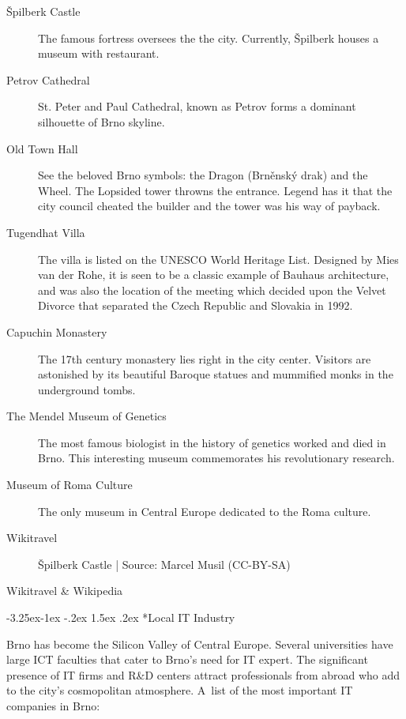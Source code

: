 \documentclass[10pt,a4paper]{article}
\makeatletter
\renewcommand\subsection{%
\@startsection{subsection}{2}{\z@}%
              {-3.25ex\@plus -1ex \@minus -.2ex}%
              {1.5ex \@plus .2ex}%
              {\color{kdelight}\sffamily\Large\bfseries}}
\makeatother
\begin{document}
\begin{description}
\item[\color{kdedarker} Špilberk Castle] The famous fortress oversees the the city. Currently, \mbox{Špilberk} houses a museum with restaurant.
\item[\color{kdedarker} Petrov Cathedral] St. Peter and Paul Cathedral, known as Petrov forms a dominant silhouette of Brno skyline.
\item[\color{kdedarker} Old Town Hall] See the beloved Brno symbols: the Dragon (Brněnský drak) and the Wheel. The Lopsided tower throwns the entrance. Legend has it that the city council cheated the builder and the tower was his way of payback.
\item[\color{kdedarker} Tugendhat Villa] The villa is listed on the UNESCO World Heritage List. Designed by Mies van der Rohe, it is seen to be a classic example of Bauhaus architecture, and was also the location of the meeting which decided upon the Velvet Divorce that separated the Czech Republic and Slovakia in 1992.
\item[\color{kdedarker} Capuchin Monastery] The 17th century monastery lies right in the city center. Visitors are astonished by its beautiful Baroque statues and mummified monks in the underground tombs.
\item[\color{kdedarker} The Mendel Museum of Genetics] The most famous biologist in the history of genetics worked and died in Brno. This interesting museum commemorates his revolutionary research.
\item[\color{kdedarker} Museum of Roma Culture] The only museum in Central Europe dedicated to the Roma culture.
\end{description}

\begin{flushright}Wikitravel\end{flushright}


\begin{figure}[ht]
\begin{center}
\footnotesize{Špilberk Castle | Source: Marcel Musil (CC-BY-SA)}
\end{center}
\end{figure}

\begin{flushright}Wikitravel \& Wikipedia\end{flushright}

\subsection*{Local IT Industry}
Brno has become the Silicon Valley of Central Europe. Several
universities have large ICT faculties that cater to Brno's need for IT
expert. The significant presence of IT firms and R\&D centers attract
professionals from abroad who add to the city's cosmopolitan
atmosphere. A~list of the most important IT companies in Brno:
\end{document}
